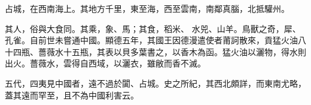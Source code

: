 \begin{pinyinscope}
 占城，在西南海上。其地方千里，東至海，西至雲南，南鄰真腦，北抵驩州。



 其人，俗與大食同。其乘，象、馬；其食，稻米、
 水兕、山羊。鳥獸之奇，犀、孔雀。自前世未嘗通中國。顯德五年，其國王因德漫遣使者莆訶散來，貢猛火油八十四瓶、薔薇水十五瓶，其表以貝多葉書之，以香木為函。猛火油以灑物，得水則出火。薔薇水，雲得自西域，以灑衣，雖敝而香不滅。



 五代，四夷見中國者，遠不過於闐、占城。史之所紀，其西北頗詳，而東南尤略，蓋其遠而罕至，且不為中國利害云。



\end{pinyinscope}